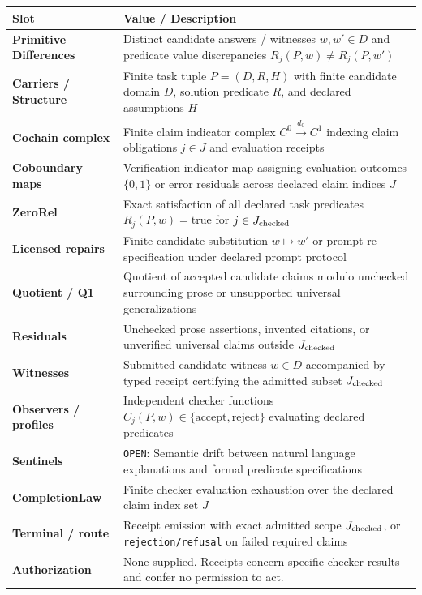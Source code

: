 \documentclass[
  11pt,
]{article}
\newcommand{\passthrough}[1]{#1}
\begin{document}
\begin{longtable}[]{@{}
  >{\raggedright\arraybackslash}p{}
  >{\raggedright\arraybackslash}p{}@{}}
\toprule\noalign{}
\begin{minipage}[b]{\linewidth}\raggedright
Slot
\end{minipage} & \begin{minipage}[b]{\linewidth}\raggedright
Value / Description
\end{minipage} \\
\midrule\noalign{}
\endhead
\bottomrule\noalign{}
\endlastfoot
\textbf{Primitive Differences} & Distinct candidate answers / witnesses
\(w,\allowbreak  w' \in D\) and predicate value discrepancies
\(R_j(P,\allowbreak  w) \neq R_j(P,\allowbreak  w')\) \\
\textbf{Carriers / Structure} & Finite task tuple
\(P = (D,\allowbreak  R,\allowbreak  H)\) with finite candidate domain
\(D\), solution predicate \(R\), and declared assumptions \(H\) \\
\textbf{Cochain complex} & Finite claim indicator complex
\(C^0 \xrightarrow{d_0} C^1\) indexing claim obligations \(j \in J\) and
evaluation receipts \\
\textbf{Coboundary maps} & Verification indicator map assigning
evaluation outcomes \(\{0,\allowbreak  1\}\) or error residuals across
declared claim indices \(J\) \\
\textbf{ZeroRel} & Exact satisfaction of all declared task predicates
\(R_j(P,\allowbreak  w) = \text{true}\) for \(j \in J_{\rm checked}\) \\
\textbf{Licensed repairs} & Finite candidate substitution
\(w \mapsto w'\) or prompt re-specification under declared prompt
protocol \\
\textbf{Quotient / Q1} & Quotient of accepted candidate claims modulo
unchecked surrounding prose or unsupported universal generalizations \\
\textbf{Residuals} & Unchecked prose assertions, invented citations, or
unverified universal claims outside \(J_{\rm checked}\) \\
\textbf{Witnesses} & Submitted candidate witness \(w \in D\) accompanied
by typed receipt certifying the admitted subset \(J_{\rm checked}\) \\
\textbf{Observers / profiles} & Independent checker functions
\(C_j(P,\allowbreak  w) \in \{\text{accept},\allowbreak  \text{reject}\}\)
evaluating declared predicates \\
\textbf{Sentinels} & \passthrough{\lstinline!OPEN!}: Semantic drift
between natural language explanations and formal predicate
specifications \\
\textbf{CompletionLaw} & Finite checker evaluation exhaustion over the
declared claim index set \(J\) \\
\textbf{Terminal / route} & Receipt emission with exact admitted scope
\(J_{\rm checked}\), or \nolinkurl{rejection/refusal} on failed required
claims \\
\textbf{Authorization} & None supplied. Receipts concern specific
checker results and confer no permission to act. \\
\end{longtable}
\end{document}
